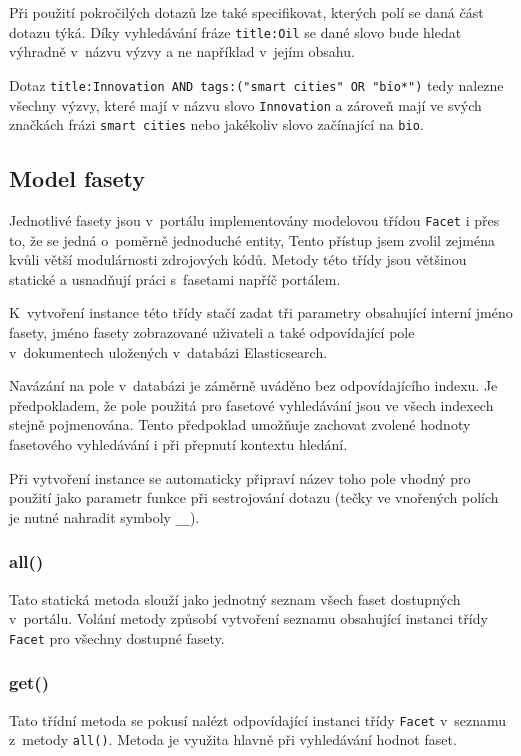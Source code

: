 Při použití pokročilých dotazů lze také specifikovat, kterých polí se daná část dotazu týká. Díky vyhledávání fráze \texttt{title:Oil} se dané slovo bude hledat výhradně v~názvu výzvy a ne například v~jejím obsahu.


Dotaz \texttt{title:Innovation AND tags:("smart cities"~OR "bio*")} tedy nalezne všechny výzvy, které mají v názvu slovo \texttt{Innovation} a zároveň mají ve svých značkách frázi \texttt{smart cities} nebo jakékoliv slovo začínající na \texttt{bio}.

\subsection{Model fasety}
Jednotlivé fasety jsou v~portálu implementovány modelovou třídou \texttt{Facet} i přes to, že se jedná o~poměrně jednoduché entity, Tento přístup jsem zvolil zejména kvůli větší modulárnosti zdrojových kódů. Metody této třídy jsou většinou statické a usnadňují práci s~fasetami napříč portálem.

K~vytvoření instance této třídy stačí zadat tři parametry obsahující interní jméno fasety, jméno fasety zobrazované uživateli a také odpovídající pole v~dokumentech uložených v~databázi Elasticsearch. 

Navázání na pole v~databázi je záměrně uváděno bez odpovídajícího indexu. Je předpokladem, že pole použitá pro fasetové vyhledávání jsou ve všech indexech stejně pojmenována. Tento předpoklad umožňuje zachovat zvolené hodnoty fasetového vyhledávání i při přepnutí kontextu hledání. 

Při vytvoření instance se automaticky připraví název toho pole vhodný pro použití jako parametr funkce při sestrojování dotazu (tečky ve vnořených polích je nutné nahradit symboly \texttt{\_\_}). 

\subsubsection*{all()}
Tato statická metoda slouží jako jednotný seznam všech faset dostupných v~portálu. Volání metody způsobí vytvoření seznamu obsahující instanci třídy \texttt{Facet} pro všechny dostupné fasety.

\subsubsection*{get()}
Tato třídní metoda se pokusí nalézt odpovídající instanci třídy \texttt{Facet} v~seznamu z~metody \texttt{all()}. Metoda je využita hlavně při vyhledávání hodnot faset.

